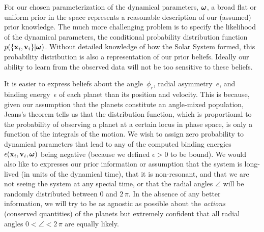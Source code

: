For our chosen parameterization of the dynamical parameters,
$\boldsymbol{{\omega}}$, a broad flat or uniform prior in the space represents a
reasonable description of our (assumed) prior knowledge.  The much
more challenging problem is to specify the likelihood of the dynamical
parameters, the conditional probability distribution function
$p(\{\boldsymbol{\mathbf{x}}_i,\boldsymbol{\mathbf{v}}_i\}|\boldsymbol{{\omega}})$. Without detailed knowledge of how the Solar
System formed, this probability distribution is also a representation
of our prior beliefs. Ideally our ability to learn from the observed
data will not be too sensitive to these beliefs.

It is easier to express beliefs about the angle~$\phi_r$, radial
asymmetry~$e$, and binding energy~$\epsilon$ of each planet than its
position and velocity. This is because, given our assumption that the
planets constitute an angle-mixed population, Jeans's theorem
\citep{Jeans15a,2008gady.book.....B} tells us that the distribution
function, which is proportional to the probability of observing a
planet at a certain locus in phase space, is only a function of the
integrals of the motion. We wish to assign zero probability to
dynamical parameters that lead to any of the computed binding energies
$\epsilon(\boldsymbol{\mathbf{x}}_i,\boldsymbol{\mathbf{v}}_i,\boldsymbol{{\omega}})$ being negative (because we
defined $\epsilon > 0$ to be bound). We would also like to expresses
our prior information or assumption that the system is long-lived (in
units of the dynamical time), that it is non-resonant, and that we are
not seeing the system at any special time, or that the radial angles
$\angle$ will be randomly distributed between $0$ and $2\,\pi$. In the
absence of any better information, we will try to be as agnostic as
possible about the \emph{actions} (conserved quantities) of the
planets but extremely confident that all radial angles
$0<\angle<2\,\pi$ are equally likely.

